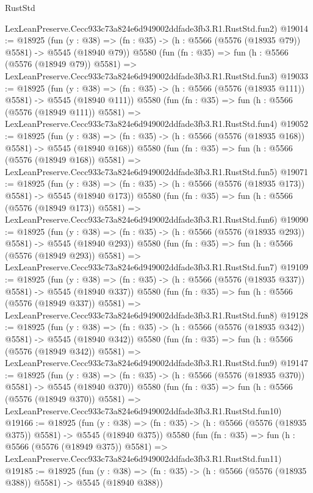 \begin{lexlean}{RustStd}
\begin{coremodule}
    LexLeanPreserve.Cecc933c73a824e6d949002ddfade3fb3.R1.RustStd.fun2)
@19014 := @18925
    (fun (y : @38) => (fn : @35) -> (h : @5566 (@5576 (@18935 @79)) @5581) -> @5545 (@18940 @79))
    @5580
    (fun (fn : @35) =>
    fun (h : @5566 (@5576 (@18949 @79)) @5581) =>
    LexLeanPreserve.Cecc933c73a824e6d949002ddfade3fb3.R1.RustStd.fun3)
@19033 := @18925
    (fun (y : @38) => (fn : @35) -> (h : @5566 (@5576 (@18935 @111)) @5581) -> @5545 (@18940 @111))
    @5580
    (fun (fn : @35) =>
    fun (h : @5566 (@5576 (@18949 @111)) @5581) =>
    LexLeanPreserve.Cecc933c73a824e6d949002ddfade3fb3.R1.RustStd.fun4)
@19052 := @18925
    (fun (y : @38) => (fn : @35) -> (h : @5566 (@5576 (@18935 @168)) @5581) -> @5545 (@18940 @168))
    @5580
    (fun (fn : @35) =>
    fun (h : @5566 (@5576 (@18949 @168)) @5581) =>
    LexLeanPreserve.Cecc933c73a824e6d949002ddfade3fb3.R1.RustStd.fun5)
@19071 := @18925
    (fun (y : @38) => (fn : @35) -> (h : @5566 (@5576 (@18935 @173)) @5581) -> @5545 (@18940 @173))
    @5580
    (fun (fn : @35) =>
    fun (h : @5566 (@5576 (@18949 @173)) @5581) =>
    LexLeanPreserve.Cecc933c73a824e6d949002ddfade3fb3.R1.RustStd.fun6)
@19090 := @18925
    (fun (y : @38) => (fn : @35) -> (h : @5566 (@5576 (@18935 @293)) @5581) -> @5545 (@18940 @293))
    @5580
    (fun (fn : @35) =>
    fun (h : @5566 (@5576 (@18949 @293)) @5581) =>
    LexLeanPreserve.Cecc933c73a824e6d949002ddfade3fb3.R1.RustStd.fun7)
@19109 := @18925
    (fun (y : @38) => (fn : @35) -> (h : @5566 (@5576 (@18935 @337)) @5581) -> @5545 (@18940 @337))
    @5580
    (fun (fn : @35) =>
    fun (h : @5566 (@5576 (@18949 @337)) @5581) =>
    LexLeanPreserve.Cecc933c73a824e6d949002ddfade3fb3.R1.RustStd.fun8)
@19128 := @18925
    (fun (y : @38) => (fn : @35) -> (h : @5566 (@5576 (@18935 @342)) @5581) -> @5545 (@18940 @342))
    @5580
    (fun (fn : @35) =>
    fun (h : @5566 (@5576 (@18949 @342)) @5581) =>
    LexLeanPreserve.Cecc933c73a824e6d949002ddfade3fb3.R1.RustStd.fun9)
@19147 := @18925
    (fun (y : @38) => (fn : @35) -> (h : @5566 (@5576 (@18935 @370)) @5581) -> @5545 (@18940 @370))
    @5580
    (fun (fn : @35) =>
    fun (h : @5566 (@5576 (@18949 @370)) @5581) =>
    LexLeanPreserve.Cecc933c73a824e6d949002ddfade3fb3.R1.RustStd.fun10)
@19166 := @18925
    (fun (y : @38) => (fn : @35) -> (h : @5566 (@5576 (@18935 @375)) @5581) -> @5545 (@18940 @375))
    @5580
    (fun (fn : @35) =>
    fun (h : @5566 (@5576 (@18949 @375)) @5581) =>
    LexLeanPreserve.Cecc933c73a824e6d949002ddfade3fb3.R1.RustStd.fun11)
@19185 := @18925
    (fun (y : @38) => (fn : @35) -> (h : @5566 (@5576 (@18935 @388)) @5581) -> @5545 (@18940 @388))

\end{coremodule}
\end{lexlean}
